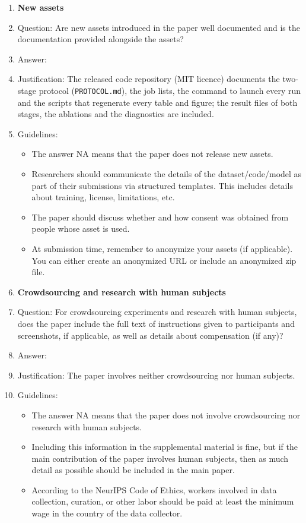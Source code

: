 \documentclass{article}
\begin{document}
\begin{enumerate}
\item {\bf New assets}
    \item[] Question: Are new assets introduced in the paper well documented and is the documentation provided alongside the assets?
    \item[] Answer: \answerYes{}
    \item[] Justification: The released code repository (MIT licence) documents the two-stage protocol (\texttt{PROTOCOL.md}), the job lists, the command to launch every run and the scripts that regenerate every table and figure; the result files of both stages, the ablations and the diagnostics are included.
    \item[] Guidelines:
    \begin{itemize}
        \item The answer NA means that the paper does not release new assets.
        \item Researchers should communicate the details of the dataset/code/model as part of their submissions via structured templates. This includes details about training, license, limitations, etc.
        \item The paper should discuss whether and how consent was obtained from people whose asset is used.
        \item At submission time, remember to anonymize your assets (if applicable). You can either create an anonymized URL or include an anonymized zip file.
    \end{itemize}

\item {\bf Crowdsourcing and research with human subjects}
    \item[] Question: For crowdsourcing experiments and research with human subjects, does the paper include the full text of instructions given to participants and screenshots, if applicable, as well as details about compensation (if any)?
    \item[] Answer: \answerNA{}
    \item[] Justification: The paper involves neither crowdsourcing nor human subjects.
    \item[] Guidelines:
    \begin{itemize}
        \item The answer NA means that the paper does not involve crowdsourcing nor research with human subjects.
        \item Including this information in the supplemental material is fine, but if the main contribution of the paper involves human subjects, then as much detail as possible should be included in the main paper.
        \item According to the NeurIPS Code of Ethics, workers involved in data collection, curation, or other labor should be paid at least the minimum wage in the country of the data collector.
    \end{itemize}


\end{enumerate}
\end{document}
